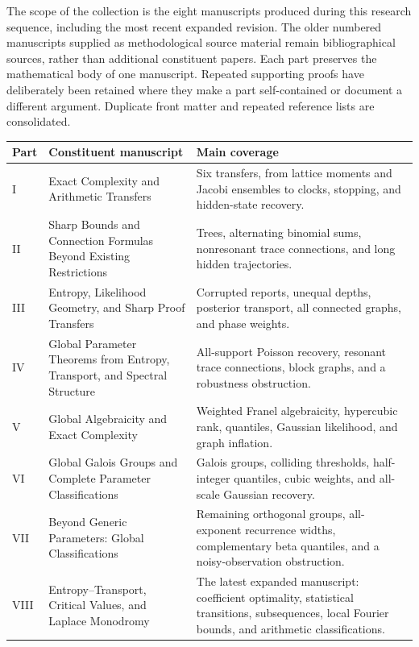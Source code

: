 \documentclass[11pt,a4paper]{article}
\theoremstyle{definition}
\theoremstyle{remark}
\numberwithin{equation}{section}
\begin{document}
The scope of the collection is the eight manuscripts produced during this
research sequence, including the most recent expanded revision. The older
numbered manuscripts supplied as methodological source material remain
bibliographical sources, rather than additional constituent papers.
Each part preserves the mathematical body of one manuscript. Repeated
supporting proofs have deliberately been retained where they make a part
self-contained or document a different argument. Duplicate front matter
and repeated reference lists are consolidated.

\begin{center}\small
\begin{tabular}{@{}>{\raggedright\arraybackslash}p{}>{\raggedright\arraybackslash}p{}>{\raggedright\arraybackslash}p{}@{}}
\toprule
Part & Constituent manuscript & Main coverage\\
\midrule
I & Exact Complexity and Arithmetic Transfers & Six transfers, from lattice moments and Jacobi ensembles to clocks, stopping, and hidden-state recovery.\\[5pt]
II & Sharp Bounds and Connection Formulas Beyond Existing Restrictions & Trees, alternating binomial sums, nonresonant trace connections, and long hidden trajectories.\\[5pt]
III & Entropy, Likelihood Geometry, and Sharp Proof Transfers & Corrupted reports, unequal depths, posterior transport, all connected graphs, and phase weights.\\[5pt]
IV & Global Parameter Theorems from Entropy, Transport, and Spectral Structure & All-support Poisson recovery, resonant trace connections, block graphs, and a robustness obstruction.\\[5pt]
V & Global Algebraicity and Exact Complexity & Weighted Franel algebraicity, hypercubic rank, quantiles, Gaussian likelihood, and graph inflation.\\[5pt]
VI & Global Galois Groups and Complete Parameter Classifications & Galois groups, colliding thresholds, half-integer quantiles, cubic weights, and all-scale Gaussian recovery.\\[5pt]
VII & Beyond Generic Parameters: Global Classifications & Remaining orthogonal groups, all-exponent recurrence widths, complementary beta quantiles, and a noisy-observation obstruction.\\[5pt]
VIII & Entropy--Transport, Critical Values, and Laplace Monodromy & The latest expanded manuscript: coefficient optimality, statistical transitions, subsequences, local Fourier bounds, and arithmetic classifications.\\
\bottomrule
\end{tabular}
\end{center}
\end{document}
